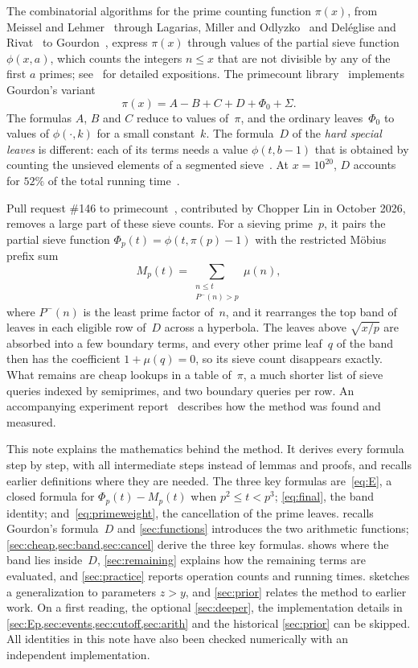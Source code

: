 \documentclass[11pt,a4paper]{amsart}
\numberwithin{equation}{section}
\newcommand{\Pminus}{P^{-}}
\begin{document}
The combinatorial algorithms for the prime counting function $\pi(x)$, from
Meissel and Lehmer~\cite{Lehmer1959} through Lagarias, Miller and
Odlyzko~\cite{LMO1985} and Del\'eglise and Rivat~\cite{DR1996} to
Gourdon~\cite{Gourdon2001}, express $\pi(x)$ through values of the partial sieve
function $\phi(x,a)$, which counts the integers $n\le x$ that are not divisible
by any of the first $a$ primes; see~\cite{OeS2006,Staple2015,Staple2015thesis} for detailed
expositions. The primecount library~\cite{primecount} implements Gourdon's
variant
\begin{equation}\label{eq:gourdon}
  \pi(x)=A-B+C+D+\Phi_0+\Sigma.
\end{equation}
The formulas $A$, $B$ and $C$ reduce to values of~$\pi$, and the ordinary
leaves~$\Phi_0$ to values of $\phi(\cdot,k)$ for a small constant~$k$. The
formula~$D$ of the \emph{hard special leaves} is different: each of its terms
needs a value $\phi(t,b-1)$ that is obtained by counting the unsieved elements
of a segmented sieve~\cite{Walisch2025hard}. At $x=10^{20}$, $D$ accounts for
$52\%$ of the total running time~\cite[\S4]{Lin2026}.

Pull request \#146 to primecount~\cite{PR146}, contributed by Chopper Lin in
October 2026, removes a large part of these sieve counts. For a sieving
prime~$p$, it pairs the partial sieve function $\Phi_p(t)=\phi(t,\pi(p)-1)$ with
the restricted M\"obius prefix sum
\[
  M_p(t)=\sum_{\substack{n\le t\\ \Pminus(n)>p}}\mu(n),
\]
where $\Pminus(n)$ is the least prime factor of~$n$, and it rearranges the top
band of leaves in each eligible row of~$D$ across a hyperbola. The leaves above
$\sqrt{x/p}$ are absorbed into a few boundary terms, and every other prime
leaf~$q$ of the band then has the coefficient $1+\mu(q)=0$, so its sieve count
disappears exactly. What remains are cheap lookups in a table of~$\pi$, a much
shorter list of sieve queries indexed by semiprimes, and two boundary queries
per row. An
accompanying experiment report~\cite{Lin2026} describes how the method was found
and measured.

This note explains the mathematics behind the method. It derives every formula
step by step, with all intermediate steps instead of lemmas and proofs, and
recalls earlier definitions where they are needed. The three key formulas
are~\eqref{eq:E}, a closed formula for $\Phi_p(t)-M_p(t)$ when $p^2\le t<p^3$;
\eqref{eq:final}, the band identity; and~\eqref{eq:primeweight}, the
cancellation of the prime leaves.  recalls Gourdon's
formula~$D$ and \cref{sec:functions} introduces the two arithmetic functions;
\cref{sec:cheap,sec:band,sec:cancel} derive the three key formulas.
 shows where the band lies inside~$D$, \cref{sec:remaining}
explains how the remaining terms are evaluated, and \cref{sec:practice} reports
operation counts and running times.  sketches a
generalization to parameters $z>y$, and \cref{sec:prior} relates the method to
earlier work. On a first reading, the optional \cref{sec:deeper}, the
implementation details in \cref{sec:Ep,sec:events,sec:cutoff,sec:arith} and the
historical \cref{sec:prior} can be skipped. All identities in this note have also been checked numerically
with an independent implementation.
\end{document}
